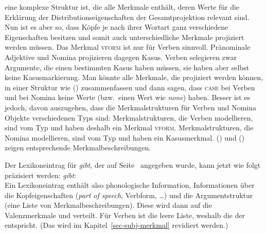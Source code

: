 eine komplexe Struktur ist, die alle Merkmale enthält, deren Werte für die
Erklärung der Distributionseigenschaften\label{page-kopf-merkmal} der Gesamtprojektion relevant sind.
\ea
\z
Nun ist es aber so, dass Köpfe je nach ihrer Wortart ganz verschiedene Eigenschaften
besitzen und somit auch unterschiedliche Merkmale projiziert werden müssen.
Das Merkmal \textsc{vform} ist nur für Verben sinnvoll. Pränominale Adjektive und 
Nomina projizieren dagegen Kasus. Verben selegieren zwar Argumente, die einen
bestimmten Kasus haben müssen, sie haben aber selbst keine Kasusmarkierung.
Man könnte alle Merkmale, die projiziert werden können, in einer Struktur wie
() zusammenfassen und dann sagen, dass \textsc{case} bei Verben und \vform
bei Nomina keine Werte (bzw.\ einen Wert wie \emph{none}) haben.
\ea
\z
Besser ist es jedoch, davon auszugehen, dass die Merkmalstrukturen für
Verben und Nomina Objekte verschiedenen Typs sind: Merkmalstrukturen,
die Verben modellieren, sind vom Typ  und haben deshalb
ein Merkmal \textsc{vform}. Merkmalstrukturen, die Nomina modellieren,
sind vom Typ  und haben ein
Kasusmerkmal\label{page-ref-case-feat}. () und () zeigen entsprechende
Merkmalbeschreibungen.
\ea
{}
\z
\ea
\z

\noindent
Der Lexikoneintrag für \emph{gibt}, der auf Seite~\pageref{le-gibt-1}
angegeben wurde, kann jetzt wie folgt präzisiert werden:
\ea
\emph{gibt}:\\
\z
Ein Lexikoneintrag enthält also phonologische Information, Informationen über die Kopfeigenschaften
(\emph{part of speech}, Verbform, \ldots) und die Argumentstruktur (eine Liste von
Merkmalbeschreibungen). Diese wird dann auf die Valenzmerkmale \spr und \comps verteilt. Für Verben
ist \spr die leere Liste, weshalb die \compsl der \argstl entspricht. (Das wird im
Kapitel~\ref{sec-subj-merkmal} revidiert werden.)


